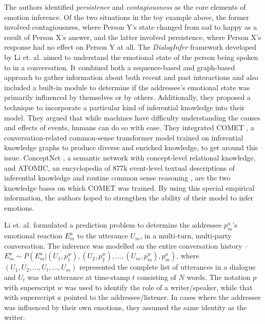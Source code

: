 The authors identified \textit{persistence} and \textit{contagiousness} \cite{10.1016/j.knosys.2019.105084, hazarika-etal-2018-icon} as the core elements of emotion inference. Of the two situations in the toy example above, the former involved contagiousness, where Person Y's state changed from sad to happy as a result of Person X's answer, and the latter involved persistence, where Person X's response had no effect on Person Y at all. The \textit{DialogInfer} framework developed by Li et. al. aimed to understand the emotional state of the person being spoken to in a conversation. It combined both a sequence-based and graph-based approach to gather information about both recent and past interactions and also included a built-in module to determine if the addressee's emotional state was primarily influenced by themselves or by others. Additionally, they proposed a technique to incorporate a particular kind of inferential knowledge into their model. They argued that while machines have difficulty understanding the causes and effects of events, humans can do so with ease. They integrated COMET \cite{bosselut-etal-2019-comet}, a conversation-related common-sense transformer model trained on inferential knowledge graphs to produce diverse and enriched knowledge, to get around this issue. ConceptNet \cite{Speer2016ConceptNet5A}, a semantic network with concept-level relational knowledge, and ATOMIC, an encyclopedia of 877k event-level textual descriptions of inferential knowledge and routine common sense reasoning \cite{10.1609/aaai.v33i01.33013027}, are the two knowledge bases on which COMET was trained. By using this special empirical information, the authors hoped to strengthen the ability of their model to infer emotions.

Li et. al. formulated a prediction problem to determine the addressee $p^a_m$’s emotional reaction $E_m^a$ to the utterance $U_m$, in a multi-turn, multi-party conversation. The inference was modelled on the entire conversation history --
$E_m^a \sim P(E_m^a |(U_1, p^w_1 ), (U_2, p^w_2 ), . . . , (U_m, p^w_m),\allowbreak p^a_m)$, where $(U_1,U_2,...,U_t,...,U_m)$ represented the complete list of utterances in a dialogue and $U_t$ was the utterance at time-stamp $t$ consisting of $N$ words. The notation $p$ with superscript $w$ was used to identify the role of a writer/speaker, while that with superscript $a$ pointed to the addressee/listener. In cases where the addressee was influenced by their own emotions, they assumed the same identity as the writer. 

